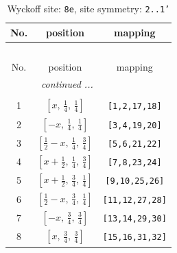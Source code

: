 \documentclass[fleqn,8pt]{jsarticle}
\begin{document}
\begin{longtable}{ccc}
\caption{Wyckoff site: {\tt 8e}, site symmetry: {\tt 2..1'}}
 \\
 \hline \hline
No. & position & mapping \\ \hline \endfirsthead

\multicolumn{2}{l}{\tablename\ \thetable{}} \\
 \hline \hline
No. & position & mapping \\ \hline \endhead

 \hline \hline
\multicolumn{2}{r}{\footnotesize\it continued ...} \\ \endfoot

 \hline \hline
\multicolumn{2}{r}{} \\ \endlastfoot

1 & $\left[ x,\, \frac{1}{4},\, \frac{1}{4} \right]$ & {\tt [1,2,17,18]} \\ \hline
2 & $\left[ - x,\, \frac{1}{4},\, \frac{1}{4} \right]$ & {\tt [3,4,19,20]} \\ \hline
3 & $\left[ \frac{1}{2} - x,\, \frac{1}{4},\, \frac{3}{4} \right]$ & {\tt [5,6,21,22]} \\ \hline
4 & $\left[ x + \frac{1}{2},\, \frac{1}{4},\, \frac{3}{4} \right]$ & {\tt [7,8,23,24]} \\ \hline
5 & $\left[ x + \frac{1}{2},\, \frac{3}{4},\, \frac{1}{4} \right]$ & {\tt [9,10,25,26]} \\ \hline
6 & $\left[ \frac{1}{2} - x,\, \frac{3}{4},\, \frac{1}{4} \right]$ & {\tt [11,12,27,28]} \\ \hline
7 & $\left[ - x,\, \frac{3}{4},\, \frac{3}{4} \right]$ & {\tt [13,14,29,30]} \\ \hline
8 & $\left[ x,\, \frac{3}{4},\, \frac{3}{4} \right]$ & {\tt [15,16,31,32]} \\
\end{longtable}
\renewcommand{\arraystretch}{1.2}
\end{document}
